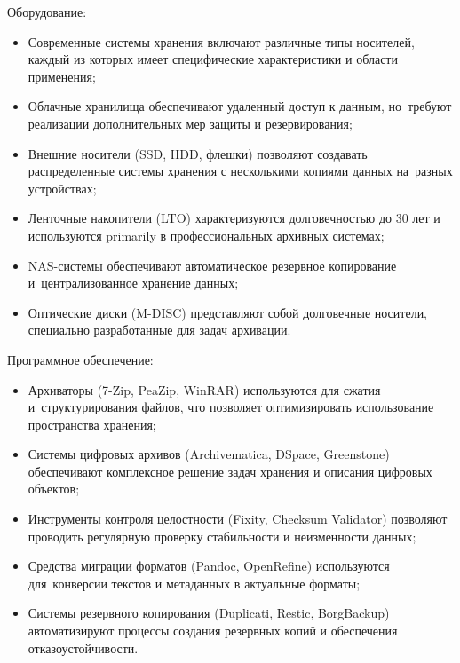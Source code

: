 \documentclass{ou}
\begin{document}
Оборудование:
\begin{itemize}[label=-, leftmargin=0em, itemindent=3.35em, nosep]
\item Современные системы хранения включают различные типы носителей, каждый из которых имеет специфические характеристики и области применения;
\item Облачные хранилища обеспечивают удаленный доступ к данным, но~требуют реализации дополнительных мер защиты и резервирования;
\item Внешние носители (SSD, HDD, флешки) позволяют создавать распределенные системы хранения с несколькими копиями данных на~разных устройствах;
\item Ленточные накопители (LTO) характеризуются долговечностью до 30 лет и используются primarily в профессиональных архивных системах;
\item NAS-системы обеспечивают автоматическое резервное копирование и~централизованное хранение данных;
\item Оптические диски (M-DISC) представляют собой долговечные носители, специально разработанные для задач архивации.
\end{itemize}

Программное обеспечение:
\begin{itemize}[label=-, leftmargin=0em, itemindent=3.35em, nosep]
\item Архиваторы (7-Zip, PeaZip, WinRAR) используются для сжатия и~структурирования файлов, что позволяет оптимизировать использование пространства хранения;
\item Системы цифровых архивов (Archivematica, DSpace, Greenstone) обеспечивают комплексное решение задач хранения и описания цифровых объектов;
\item Инструменты контроля целостности (Fixity, Checksum Validator) позволяют проводить регулярную проверку стабильности и неизменности данных;
\item Средства миграции форматов (Pandoc, OpenRefine) используются для~конверсии текстов и метаданных в актуальные форматы;
\item Системы резервного копирования (Duplicati, Restic, BorgBackup) автоматизируют процессы создания резервных копий и обеспечения отказоустойчивости.
\end{itemize}
\newpage
{}
\nocite{*}  


\end{document}

